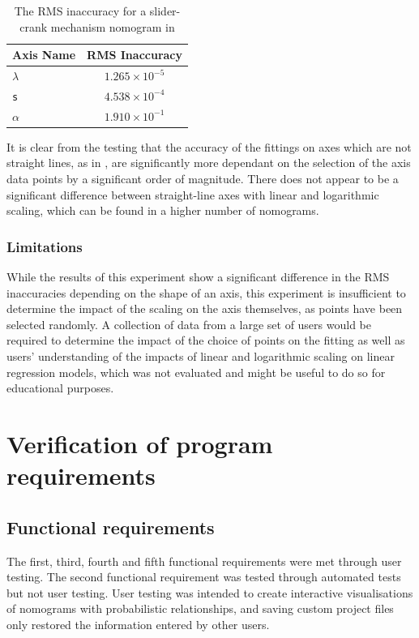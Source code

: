 \documentclass{l4proj}
\begin{document}
\begin{table}[h]
    \centering
    \begin{tabular}{lc}
        \toprule
        Axis Name & RMS Inaccuracy \\
        \midrule
        \texttt{$\lambda$} & $1.265 \times 10^{-5}$ \\
        \texttt{s} & $4.538 \times 10^{-4}$ \\
        \texttt{$\alpha$} & $1.910 \times 10^{-1}$ \\
        \bottomrule
    \end{tabular}
    \caption{The RMS inaccuracy for a slider-crank mechanism nomogram in }
\end{table}

It is clear from the testing that the accuracy of the fittings on axes which are not straight lines, as in , are significantly more dependant on the selection of the axis data points by a significant order of magnitude. There does not appear to be a significant difference between straight-line axes with linear and logarithmic scaling, which can be found in a higher number of nomograms.  

\subsubsection{Limitations}

While the results of this experiment show a significant difference in the RMS inaccuracies depending on the shape of an axis, this experiment is insufficient to determine the impact of the scaling on the axis themselves, as points have been selected randomly. A collection of data from a large set of users would be required to determine the impact of the choice of points on the fitting as well as users' understanding of the impacts of linear and logarithmic scaling on linear regression models, which was not evaluated and might be useful to do so for educational purposes. 

\section{Verification of program requirements}

\subsection{Functional requirements}

The first, third, fourth and fifth functional requirements were met through user testing. 
The second functional requirement was tested through automated tests but not user testing. User testing was intended to create interactive visualisations of nomograms with probabilistic relationships, and saving custom project files only restored the information entered by other users.
\end{document}
